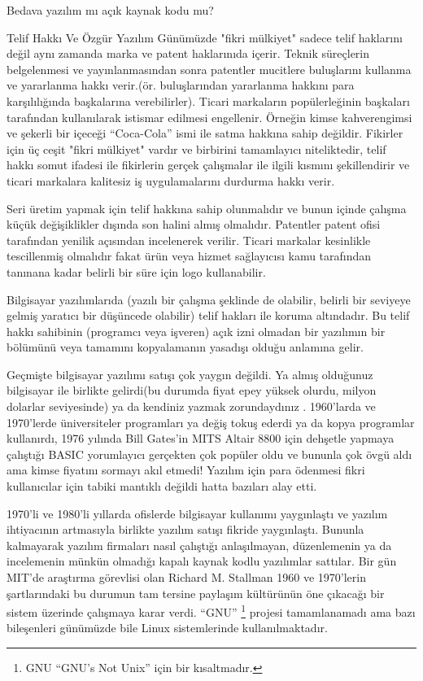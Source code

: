 \begin{section}{Bedava yazılım mı açık kaynak kodu mu?}
\begin{subsection}{Telif Hakkı Ve Özgür Yazılım}
Günümüzde "fikri mülkiyet" sadece telif haklarını değil aynı zamanda marka ve patent haklarınıda içerir. Teknik süreçlerin belgelenmesi  ve yayınlanmasından sonra patentler mucitlere buluşlarını kullanma ve yararlanma hakkı verir.(ör. buluşlarından yararlanma hakkını para karşılılığında başkalarına verebilirler). Ticari markaların popülerleğinin başkaları tarafından kullanılarak istismar edilmesi engellenir. Örneğin kimse  kahverengimsi ve şekerli bir içeceği “Coca-Cola” ismi ile satma hakkına sahip değildir. Fikirler için üç ceşit "fikri mülkiyet"  vardır ve birbirini tamamlayıcı niteliktedir, telif hakkı somut ifadesi ile fikirlerin gerçek çalışmalar ile ilgili kısmını şekillendirir ve ticari markalara  kalitesiz iş uygulamalarını durdurma hakkı verir.

Seri üretim yapmak için telif hakkına sahip olunmalıdır ve bunun içinde çalışma küçük değişiklikler dışında son halini almış olmalıdır. Patentler patent ofisi tarafından yenilik açısından incelenerek verilir. Ticari markalar kesinlikle tescillenmiş olmalıdır fakat ürün veya hizmet sağlayıcısı kamu tarafından tanınana kadar belirli bir süre için logo kullanabilir.

Bilgisayar yazılımlarıda (yazılı bir çalışma şeklinde de olabilir, belirli bir seviyeye gelmiş yaratıcı bir düşüncede olabilir) telif hakları ile koruma altındadır. Bu telif hakkı sahibinin (programcı veya işveren) açık izni olmadan bir yazılımın bir bölümünü veya tamamını kopyalamanın yasadışı olduğu anlamına gelir.

Geçmişte bilgisayar yazılımı satışı çok yaygın değildi. Ya almış olduğunuz bilgisayar ile birlikte gelirdi(bu durumda fiyat epey yüksek olurdu, milyon dolarlar seviyesinde) ya da kendiniz yazmak zorundaydınız . 1960'larda ve 1970'lerde üniversiteler programları ya değiş tokuş ederdi ya da kopya programlar kullanırdı, 1976 yılında Bill Gates'in MITS Altair 8800 için dehşetle yapmaya çalıştığı BASIC yorumlayıcı gerçekten çok popüler oldu ve bununla çok övgü aldı ama kimse fiyatını sormayı akıl etmedi! Yazılım için para ödenmesi fikri kullanıcılar için tabiki mantıklı değildi hatta bazıları alay etti.

1970'li ve 1980'li yıllarda ofislerde bilgisayar kullanımı yaygınlaştı ve yazılım ihtiyacının artmasıyla birlikte yazılım satışı fikride yaygınlaştı. Bununla kalmayarak yazılım firmaları nasıl çalıştığı anlaşılmayan, düzenlemenin ya da incelemenin münkün olmadığı kapalı kaynak kodlu yazılımlar sattılar. Bir gün MIT'de araştırma görevlisi olan Richard M. Stallman 1960 ve 1970'lerin şartlarındaki bu durumun tam tersine paylaşım kültürünün öne çıkacağı bir sistem üzerinde çalışmaya karar verdi. “GNU”
\footnote{GNU “GNU’s Not Unix” için bir kısaltmadır.} projesi tamamlanamadı ama bazı bileşenleri günümüzde bile Linux sistemlerinde kullanılmaktadır.


\end{subsection}
\end{section}

